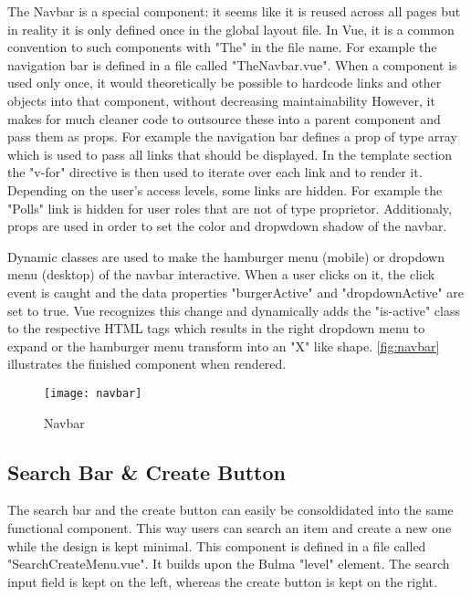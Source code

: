 The Navbar is a special component: it seems like it is reused across all pages but in reality it is only defined once in the global layout file. In Vue, it is a common convention to such components with "The" in the file name. For example the navigation bar is defined in a file called "TheNavbar.vue". When a component is used only once, it would theoretically be possible to hardcode links and other objects into that component, without decreasing maintainability However, it makes for much cleaner code to outsource these into a parent component and pass them as props. For example the navigation bar defines a prop of type array which is used to pass all links that should be displayed. In the template section the "v-for" directive is then used to iterate over each link and to render it. Depending on the user's access levels, some links are hidden. For example the "Polls" link is hidden for user roles that are not of type proprietor. Additionaly, props are used in order to set the color and dropwdown shadow of the navbar.

Dynamic classes are used to make the hamburger menu (mobile) or dropdown menu (desktop) of the navbar interactive. When a user clicks on it, the click event is caught and the data properties "burgerActive" and "dropdownActive" are set to true. Vue recognizes this change and dynamically adds the "is-active" class to the respective HTML tags which results in the right dropdown menu to expand or the hamburger menu transform into an "X" like shape. \autoref{fig:navbar} illustrates the finished component when rendered.

\begin{figure}[H]
  \begin{center}
  \texttt{[image: navbar]}
  \end{center}
  \caption{Navbar}
  \label{fig:navbar}
\end{figure}


\subsection{Search Bar \& Create Button}
The search bar and the create button can easily be consoldidated into the same functional component. This way users can search an item and create a new one while the design is kept minimal. This component is defined in a file called "SearchCreateMenu.vue". It builds upon the Bulma "level" element. The search input field is kept on the left, whereas the create button is kept on the right. 


